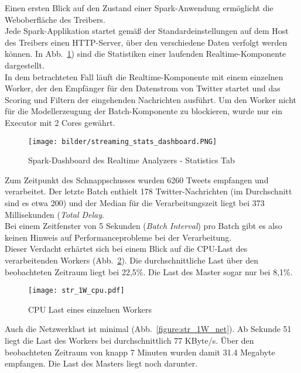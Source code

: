 Einen ersten Blick auf den Zustand einer Spark-Anwendung ermöglicht die Weboberfläche des Treibers.\\

Jede Spark-Applikation startet gemäß der Standardeinstellungen auf dem Host des Treibers einen HTTP-Server, über den verschiedene Daten verfolgt werden können. In Abb.~\ref{figure:realtime_dashboard_stats}) sind die Statistiken einer laufenden Realtime-Komponente dargestellt.\\

In dem betrachteten Fall läuft die Realtime-Komponente mit einem einzelnen Worker, der den Empfänger für den Datenstrom von Twitter startet und das Scoring und Filtern der eingehenden Nachrichten ausführt. Um den Worker nicht für die Modellerzeugung der Batch-Komponente zu blockieren, wurde nur ein Executor mit 2 Cores gewährt.

\begin{figure}[ht!]
	\centering
	\texttt{[image: bilder/streaming\_stats\_dashboard.PNG]}
	\caption{Spark-Dashboard des Realtime Analyzers - Statistics Tab}
	\label{figure:realtime_dashboard_stats}
\end{figure}

Zum Zeitpunkt des Schnappschusses wurden 6260 Tweets empfangen und verarbeitet. Der letzte Batch enthielt 178 Twitter-Nachrichten (im Durchschnitt sind es etwa 200) und der Median für die Verarbeitungszeit liegt bei 373 Millisekunden (\textit{Total Delay}.\\

Bei einem Zeitfenster von 5 Sekunden (\textit{Batch Interval}) pro Batch gibt es also keinen Hinweis auf Performanceprobleme bei der Verarbeitung.\\

Dieser Verdacht erhärtet sich bei einem Blick auf die CPU-Last des verarbeitenden Workers (Abb.~\ref{figure:str_1W_cpu}). Die durchschnittliche Last über den beobachteten Zeitraum liegt bei 22,5\%. Die Last des Master sogar nur bei 8,1\%.

\begin{figure}[ht!]
	\centering
	\texttt{[image: str\_1W\_cpu.pdf]}
	\caption{CPU Last eines einzelnen Workers}
	\label{figure:str_1W_cpu}
\end{figure}

Auch die Netzwerklast ist minimal (Abb.~\ref{figure:str_1W_net}). Ab Sekunde 51 liegt die Last des Workers bei durchschnittlich 77 KByte/s. Über den beobachteten Zeitraum von knapp 7 Minuten wurden damit 31.4 Megabyte empfangen. Die Last des Masters liegt noch darunter.

